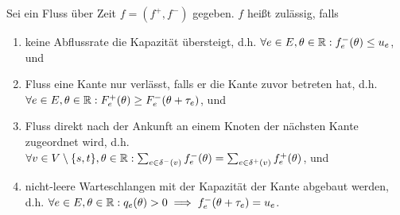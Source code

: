 \begin{definition}
	Sei ein Fluss über Zeit $f=(f^+, f^-)$ gegeben. $f$ heißt zulässig, falls
	\begin{enumerate}[label=(F\arabic*)]
		\item\label{def-feasible-flow-capacity} keine Abflussrate die Kapazität übersteigt, d.h. $\forall e\in E, \theta\in\mathbb{R}: f_e^-(\theta)\leq u_e$, und
		\item\label{weak} Fluss eine Kante nur verlässt, falls er die Kante zuvor betreten hat, d.h. $\forall e\in E, \theta\in\mathbb{R}: F_e^+(\theta) \geq F_e^-(\theta + \tau_e)$, und
		\item\label{def-feasible-flow-no-flow-at-node} Fluss direkt nach der Ankunft an einem Knoten der nächsten Kante zugeordnet wird, d.h. $\forall v\in V\setminus \{ s, t \}, \theta\in\mathbb{R}: \sum_{e\in\delta^-(v)}f^-_e(\theta) = \sum_{e\in\delta^+(v)} f_e^+(\theta)$, und
		\item\label{def-feasible-flow-queue-with-capacity} nicht-leere Warteschlangen mit der Kapazität der Kante abgebaut werden, d.h. $\forall e\in E, \theta\in\mathbb{R}: q_e(\theta) > 0 \implies f_e^-(\theta + \tau_e) = u_e$.
	\end{enumerate}
\end{definition}




